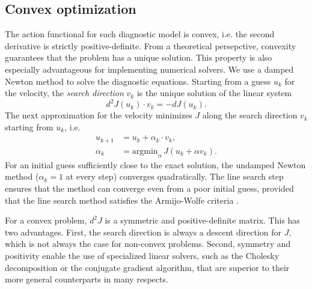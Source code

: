 \documentclass[journal abbreviation, manuscript]{copernicus}
\begin{document}
\subsection{Convex optimization}\label{subsec:convex-optimization}

The action functional for each diagnostic model is convex, i.e. the second derivative is strictly positive-definite.
From a theoretical persepctive, convexity guarantees that the problem has a unique solution.
This property is also especially advantageous for implementing numerical solvers.
We use a damped Newton method to solve the diagnostic equations.
Starting from a guess $u_k$ for the velocity, the \emph{search direction} $v_k$ is the unique solution of the linear system
\begin{equation}
    d^2J(u_k)\cdot v_k = -dJ(u_k).
    \label{eq:newton-search-direction}
\end{equation}
The next approximation for the velocity minimizes $J$ along the search direction $v_k$ starting from $u_k$, i.e.
\begin{align}
    u_{k + 1} & = u_k + \alpha_k\cdot v_k, \nonumber\\
    \alpha_k & = \text{argmin}_\alpha \hspace{2pt}J(u_k + \alpha v_k).
\end{align}
For an initial guess sufficiently close to the exact solution, the undamped Newton method ($\alpha_k = 1$ at every step) converges quadratically.
The line search step ensures that the method can converge even from a poor initial guess, provided that the line search method satisfies the Armijo-Wolfe criteria \citep{nocedal2006numerical}.

For a convex problem, $d^2J$ is a symmetric and positive-definite matrix.
This has two advantages.
First, the search direction is always a descent direction for $J$, which is not always the case for non-convex problems.
Second, symmetry and positivity enable the use of specialized linear solvers, such as the Cholesky decomposition or the conjugate gradient algorithm, that are superior to their more general counterparts in many respects.
\end{document}
